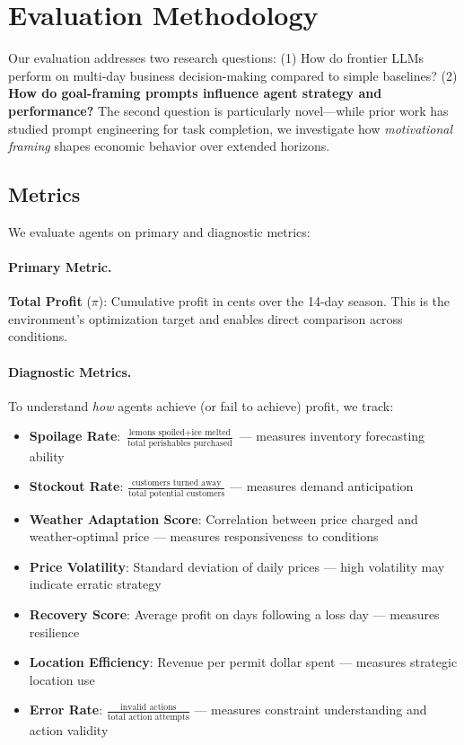 \section{Evaluation Methodology}
\label{sec:methodology}

Our evaluation addresses two research questions: (1) How do frontier LLMs perform on multi-day business decision-making compared to simple baselines? (2) \textbf{How do goal-framing prompts influence agent strategy and performance?} The second question is particularly novel---while prior work has studied prompt engineering for task completion, we investigate how \emph{motivational framing} shapes economic behavior over extended horizons.

\subsection{Metrics}
\label{sec:metrics}

We evaluate agents on primary and diagnostic metrics:

\paragraph{Primary Metric.}
\textbf{Total Profit} ($\pi$): Cumulative profit in cents over the 14-day season. This is the environment's optimization target and enables direct comparison across conditions.

\paragraph{Diagnostic Metrics.}
To understand \emph{how} agents achieve (or fail to achieve) profit, we track:

\begin{itemize}
    \item \textbf{Spoilage Rate}: $\frac{\text{lemons spoiled} + \text{ice melted}}{\text{total perishables purchased}}$ --- measures inventory forecasting ability
    \item \textbf{Stockout Rate}: $\frac{\text{customers turned away}}{\text{total potential customers}}$ --- measures demand anticipation
    \item \textbf{Weather Adaptation Score}: Correlation between price charged and weather-optimal price --- measures responsiveness to conditions
    \item \textbf{Price Volatility}: Standard deviation of daily prices --- high volatility may indicate erratic strategy
    \item \textbf{Recovery Score}: Average profit on days following a loss day --- measures resilience
    \item \textbf{Location Efficiency}: Revenue per permit dollar spent --- measures strategic location use
    \item \textbf{Error Rate}: $\frac{\text{invalid actions}}{\text{total action attempts}}$ --- measures constraint understanding and action validity
\end{itemize}

